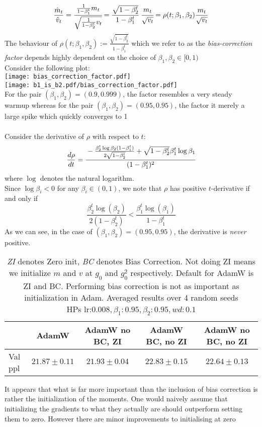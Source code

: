 \documentclass[12pt]{book}
\begin{document}
\begin{equation}
	\frac{\hat{m}_t}{\hat{v}_t} = \cfrac{\frac{1}{1-\beta_1^{t}} m_t}{\sqrt{ \frac{1}{1-\beta_2^{t}}v_t}} = \cfrac{\sqrt{1-\beta_2^{t}} }{1-\beta_1^{t}} \ \cfrac{m_t}{\sqrt{v_t} } = \rho(t; \beta_1, \beta_2) \frac{m_t}{\sqrt{v_t} }
	\label{eq: bias factor}
\end{equation}
The behaviour of $\rho(t;\beta_1,\beta_2) := \frac{\sqrt{1-\beta_2^{t}} }{1-\beta_1^{t}}$ which we refer to as the \textit{bias-correction factor} depends highly dependent on the choice of $\beta_1, \beta_2\in [0, 1)$ \\
Consider the following plot: \\
\texttt{[image: bias\_correction\_factor.pdf]}
\\
\texttt{[image: b1\_is\_b2.pdf/bias\_correction\_factor.pdf]}
\\
For the pair $(\beta_1, \beta_2) = (0.9, 0.999)$, the factor resembles a very steady warmup whereas for the pair $(\beta_1, \beta_2) = (0.95, 0.95)$, the factor it merely a large spike which quickly converges to 1\\
\\
Consider the derivative of $\rho$ with respect to $t$:
\begin{align*}
	\frac{d\rho}{dt} &= \cfrac{-\frac{\beta_2^{t}\log\beta_2(1-\beta_1^{t})}{2\sqrt{1-\beta_2^{t}}} + \sqrt{1-\beta_2^{t}} \beta_1^{t}\log\beta_1}{(1-\beta_1^{t})^2} \\
\end{align*}
where $\log$ denotes the natural logarithm. \\
Since $\log\beta_i < 0$ for any $\beta_i \in (0,1)$, we note that $\rho$ has positive $t$-derivative if and only if  
\[
\frac{\beta_2^{t}\log(\beta_2) }{2(1-\beta_2^{t})} < \frac{\beta_1^{t}\log(\beta_1)}{1-\beta_1^{t}}
\]
As we can see, in the case of $(\beta_1, \beta_2) = (0.95, 0.95)$, the derivative is \textit{never} positive. 
\begin{table}[h]
\centering
\caption{\textit{ZI} denotes Zero init, \textit{BC} denotes Bias Correction. Not doing ZI means we initialize $m$ and $v$ at $g_0$ and $g_0^2$ respectively. Default for AdamW is ZI and BC. Performing bias correction is not as important as initialization in Adam. Averaged results over 4 random seeds\\
HPs $\text{lr:}0.008, \beta_1:0.95, \beta_2: 0.95, wd:0.1$}
\vspace{0.5em}
\begin{tabular}{lcccc}
\toprule
& AdamW & AdamW no BC, ZI & AdamW BC, no ZI  &AdamW no BC, no ZI  \\
\midrule
Val ppl & $21.87 \pm 0.11$ & $21.93 \pm 0.04$ & $22.83 \pm 0.15$ & $22.64 \pm 0.13$  \\
\bottomrule
\end{tabular}
\end{table}
It appears that what is far more important than the inclusion of bias correction is rather the initialization of the moments. One would naively assume that initializing the gradients to what they actually are should outperform setting them to zero. However there are minor improvements to initialising at zero 
\end{document}
